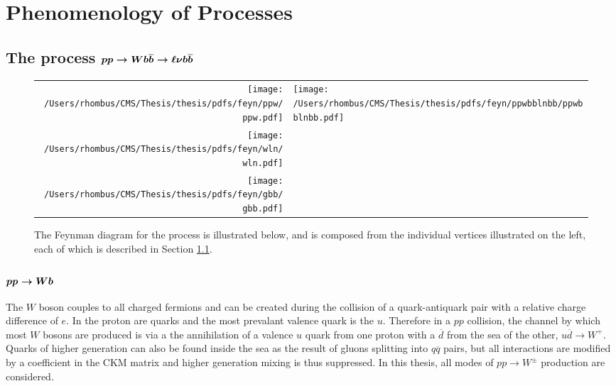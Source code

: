 

\chapter{Phenomenology of Processes}

\section[The process \ppwbblnbb]
{The process $\boldsymbol{pp\rightarrow Wb\overline{b}\rightarrow\ell\nu b\overline{b}}$} \label{sec:wbbproduction}

\begin{figure}[!htb]
 \center
 \caption[Feynman diagrams for \ppwbblnbb]{
  The Feynman diagram for the process
   \ppwbblnbb is illustrated below,
   and is composed from the individual vertices 
   illustrated on the left, each of which is
   described in Section \ref{sec:wbbproduction}.
 } 
\begin{tabular}{rl}
 \texttt{[image: /Users/rhombus/CMS/Thesis/thesis/pdfs/feyn/ppw/ppw.pdf]} & 
 \multirow{3}{*}{\texttt{[image: /Users/rhombus/CMS/Thesis/thesis/pdfs/feyn/ppwbblnbb/ppwbblnbb.pdf]}} \\
 \texttt{[image: /Users/rhombus/CMS/Thesis/thesis/pdfs/feyn/wln/wln.pdf]} & {} \\
 \texttt{[image: /Users/rhombus/CMS/Thesis/thesis/pdfs/feyn/gbb/gbb.pdf]} & {}
\end{tabular} 
    \label{fig:ppwbblnbbfeyn}
\end{figure}

 \subsection[\ppw]
 {$\boldsymbol{pp\rightarrow Wb}$}

  The $W$ boson couples to all charged fermions
   and can be
   created during the collision of a quark-antiquark
   pair with a relative charge difference of $e$.
  In the proton are quarks and the most prevalant valence
   quark is the $u$.
  Therefore in a $pp$ collision,
   the channel by which most
   $W$ bosons are produced is
   via a the annihilation of a valence $u$ quark
   from one proton with 
   a $\overline{d}$ from the sea of the other,
   $u\overline{d}\rightarrow W^+$.
  Quarks of higher generation can also be found
   inside the sea as the result of gluons splitting into
   $q\overline{q}$ pairs, but all interactions
   are modified by a coefficient in the CKM matrix
   and higher generation mixing is thus suppressed.
  In this thesis, all modes of $pp\rightarrow W^\pm$ production are
   considered.

